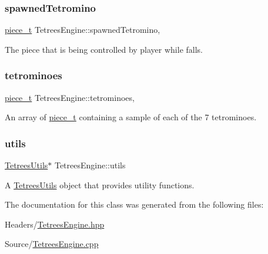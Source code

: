 \subsubsection{\texorpdfstring{spawned\+Tetromino}{spawnedTetromino}}
{\footnotesize\ttfamily \hyperlink{structpiece__t}{piece\+\_\+t} Tetrees\+Engine\+::spawned\+Tetromino\hspace{0.3cm}{\ttfamily [static]}, {\ttfamily [private]}}

The piece that is being controlled by player while falls. \mbox{\label{classTetreesEngine_a07ae13fb62e86b45c834947243a913df}} 
\subsubsection{\texorpdfstring{tetrominoes}{tetrominoes}}
{\footnotesize\ttfamily \hyperlink{structpiece__t}{piece\+\_\+t} Tetrees\+Engine\+::tetrominoes\hspace{0.3cm}{\ttfamily [static]}, {\ttfamily [private]}}

An array of \hyperlink{structpiece__t}{piece\+\_\+t} containing a sample of each of the 7 tetrominoes. \mbox{\label{classTetreesEngine_ac4d6256982306ab8a02e18793cb803c0}} 
\subsubsection{\texorpdfstring{utils}{utils}}
{\footnotesize\ttfamily \hyperlink{classTetreesUtils}{Tetrees\+Utils}$\ast$ Tetrees\+Engine\+::utils\hspace{0.3cm}{\ttfamily [private]}}

A \hyperlink{classTetreesUtils}{Tetrees\+Utils} object that provides utility functions. 

The documentation for this class was generated from the following files\+:\begin{DoxyCompactItemize}
\item 
Headers/\hyperlink{TetreesEngine_8hpp}{Tetrees\+Engine.\+hpp}\item 
Source/\hyperlink{TetreesEngine_8cpp}{Tetrees\+Engine.\+cpp}\end{DoxyCompactItemize}
